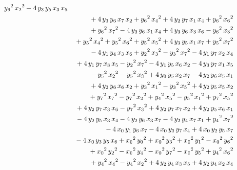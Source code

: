 \documentclass[a4paper,12pt]{book}
\begin{document}
\begin{eqnarray*}
{y_{6}}^{2}\,{x_{2}}^{2}+4\,{y_{3}}\,{y_{5}}\,{x_{3}}\,{x_{5}} \\
&&\mbox{}+4\,{y_{3}}\,{y_{6}}\,{x_{7}}\,{x_{2}}+{y_{6}}^{2}\,{x_{4}}^{2}+4\,{%
y_{2}}\,{y_{7}}\,{x_{1}}\,{x_{4}}+{y_{6}}^{2}\,{x_{6}}^{2} \\
&&\mbox{}+{y_{6}}^{2}\,{x_{7}}^{2}-4\,{y_{3}}\,{y_{6}}\,{x_{1}}\,{x_{4}}+4\,{%
y_{3}}\,{y_{6}}\,{x_{3}}\,{x_{6}}-{y_{6}}^{2}\,{x_{3}}^{2} \\
&&\mbox{}+{y_{5}}^{2}\,{x_{4}}^{2}+{y_{5}}^{2}\,{x_{6}}^{2}+{y_{5}}^{2}\,{%
x_{5}}^{2}+4\,{y_{3}}\,{y_{5}}\,{x_{1}}\,{x_{7}}+{y_{5}}^{2}\,{x_{7}}^{2} \\
&&\mbox{}-4\,{y_{1}}\,{y_{4}}\,{x_{3}}\,{x_{6}}+{y_{2}}^{2}\,{x_{3}}^{2}-{%
y_{3}}^{2}\,{x_{7}}^{2}-4\,{y_{1}}\,{y_{7}}\,{x_{2}}\,{x_{4}} \\
&&\mbox{}+4\,{y_{1}}\,{y_{7}}\,{x_{3}}\,{x_{5}}-{y_{2}}^{2}\,{x_{7}}^{2}-4\,{%
y_{1}}\,{y_{5}}\,{x_{6}}\,{x_{2}}-4\,{y_{3}}\,{y_{7}}\,{x_{1}}\,{x_{5}} \\
&&\mbox{}-{y_{5}}^{2}\,{x_{2}}^{2}-{y_{5}}^{2}\,{x_{3}}^{2}+4\,{y_{0}}\,{%
y_{5}}\,{x_{2}}\,{x_{7}}-4\,{y_{2}}\,{y_{6}}\,{x_{5}}\,{x_{1}} \\
&&\mbox{}+4\,{y_{2}}\,{y_{6}}\,{x_{6}}\,{x_{2}}+{y_{3}}^{2}\,{x_{1}}^{2}-{%
y_{3}}^{2}\,{x_{5}}^{2}+4\,{y_{2}}\,{y_{5}}\,{x_{5}}\,{x_{2}} \\
&&\mbox{}+{y_{7}}^{2}\,{x_{7}}^{2}-{y_{7}}^{2}\,{x_{2}}^{2}+{y_{4}}^{2}\,{%
x_{5}}^{2}-{y_{5}}^{2}\,{x_{1}}^{2}+{y_{7}}^{2}\,{x_{5}}^{2} \\
&&\mbox{}+4\,{y_{2}}\,{y_{7}}\,{x_{3}}\,{x_{6}}-{y_{7}}^{2}\,{x_{3}}^{2}+4\,{%
y_{2}}\,{y_{7}}\,{x_{7}}\,{x_{2}}+4\,{y_{2}}\,{y_{5}}\,{x_{6}}\,{x_{1}} \\
&&\mbox{}-4\,{y_{2}}\,{y_{5}}\,{x_{3}}\,{x_{4}}-4\,{y_{2}}\,{y_{6}}\,{x_{3}}%
\,{x_{7}}-4\,{y_{2}}\,{y_{4}}\,{x_{7}}\,{x_{1}}+{y_{4}}^{2}\,{x_{7}}^{2} \\
&&\mbox{}-4\,{x_{0}}\,{y_{1}}\,{y_{6}}\,{x_{7}}-4\,{x_{0}}\,{y_{3}}\,{y_{7}}%
\,{x_{4}}+4\,{x_{0}}\,{y_{2}}\,{y_{5}}\,{x_{7}} \\
&&\mbox{}-4\,{x_{0}}\,{y_{3}}\,{y_{5}}\,{x_{6}}+{x_{0}}^{2}\,{y_{0}}^{2}+{%
x_{0}}^{2}\,{y_{3}}^{2}+{x_{0}}^{2}\,{y_{1}}^{2}-{x_{0}}^{2}\,{y_{6}}^{2} \\
&&\mbox{}+{x_{0}}^{2}\,{y_{2}}^{2}-{x_{0}}^{2}\,{y_{4}}^{2}-{x_{0}}^{2}\,{%
y_{7}}^{2}-{x_{0}}^{2}\,{y_{5}}^{2}+{y_{4}}^{2}\,{x_{6}}^{2} \\
&&\mbox{}+{y_{4}}^{2}\,{x_{4}}^{2}-{y_{4}}^{2}\,{x_{2}}^{2}+4\,{y_{2}}\,{%
y_{4}}\,{x_{3}}\,{x_{5}}+4\,{y_{2}}\,{y_{4}}\,{x_{2}}\,{x_{4}} \\

\end{eqnarray*}
\end{document}
